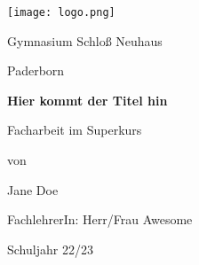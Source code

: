 \newgeometry{}
\begin{titlepage}
	\centering
	\texttt{[image: logo.png]}\par\vspace{1cm}
    \begin{bfseries}
	   {\LARGE Gymnasium Schloß Neuhaus \par}
        \large Paderborn \par
    \end{bfseries}
	\vspace{1cm}
	{\huge\bfseries Hier kommt der Titel hin\par}
	\vspace{4cm}
    \begin{flushleft}
    \begin{Large}
        
    Facharbeit im Superkurs \par
    \vspace{1cm}
    \begin{bfseries}
    von
    \par
	Jane Doe\par
    \end{bfseries}
	\vspace{1cm}
	FachlehrerIn: Herr/Frau Awesome
	\vfill

	Schuljahr 22/23
    \end{Large}
    \end{flushleft}
\end{titlepage}
\restoregeometry
